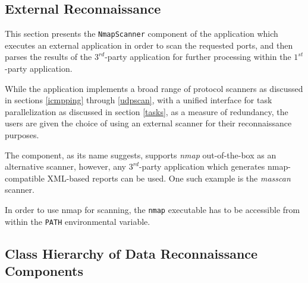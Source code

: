 \documentclass[a4paper,12pt]{article}
\begin{document}
\subsection{External Reconnaissance} \label{nmapscan}
 

	This section presents the \texttt{NmapScanner} component of the application which executes an external application in order to scan the requested ports, and then parses the results of the $3^{rd}$-party application for further processing within the $1^{st}$-party application.
	
	While the application implements a broad range of protocol scanners as discussed in sections \ref{icmpping} through \ref{udpscan}, with a unified interface for task parallelization as discussed in section \ref{tasks}, as a measure of redundancy, the users are given the choice of using an external scanner for their reconnaissance purposes.
	
	The component, as its name suggests, supports \textit{nmap} out-of-the-box as an alternative scanner, however, any $3^{rd}$-party application which generates nmap-compatible XML-based reports can be used. One such example is the \textit{masscan} scanner.
	
	In order to use nmap for scanning, the \texttt{nmap} executable has to be accessible from within the \texttt{PATH} environmental variable.

\newpage
\subsection{Class Hierarchy of Data Reconnaissance Components}
 
\end{document}
